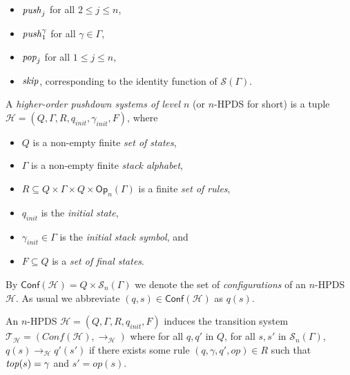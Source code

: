 \documentclass[a4paper,UKenglish,cleveref, autoref, thm-restate]{lipics-v2021}
\newcommand{\T}{\mathcal{T}}
\renewcommand{\H}{\mathcal{H}}
\newcommand{\Conf}{\mathsf{Conf}}
\newcommand{\Op}{\mathsf{Op}}
\begin{document}
\begin{itemize}
\item $\text{\textit{push}}_j$ for all $2 \leq j \leq n$,

\item $\text{\textit{push}}_1^\gamma$ for all $\gamma \in \Gamma$,

\item $\text{\textit{pop}}_j$ for all $1 \leq j \leq n$,

\item $\text{\textit{skip}}$, corresponding to the identity function of $\mathscr{S}(\Gamma)$.

\end{itemize}





\begin{samepage}
\par\noindent\ignorespacesafterend
A {\em higher-order pushdown systems of level $n$} (or $n$-HPDS for short) 
is a tuple $\H=(Q, \Gamma, R, q_{init}, \gamma_{init}, F)$,
where 
\begin{itemize}
        \item $Q$ is a non-empty finite {\em set of  states},
        \item $\Gamma$ is a non-empty finite {\em  stack alphabet},
	\item $R\subseteq Q\times \Gamma \times Q \times \Op_n(\Gamma)$ is a finite {\em set of  rules},
        \item $q_{init}$ is the {\em initial  state},
        \item $\gamma_{init} \in \Gamma$ is the {\em %
initial stack symbol}, and
	\item $F\subseteq Q$ is a {\em set of final  states}.
		\end{itemize}
\end{samepage}


\par\noindent\ignorespacesafterend
By $\Conf(\mathcal{H}) = Q \times \mathscr{S}_n(\Gamma)$
we denote the set of {\em configurations} of an $n$-HPDS $\H$. 
As usual we abbreviate $(q,s) \in \Conf(\mathcal{H})$ as $q(s)$.



An $n$-HPDS $\H=(Q, \Gamma, R, q_{init}, F)$
induces the transition system $\T_\H = (Conf(\mathcal{H}), \rightarrow_{\mathcal{H}})$
where
for all $q,q'$ in $Q$,
for all $s,s'$ in $\mathscr{S}_n(\Gamma)$,
$q(s) \rightarrow_{\mathcal{H}} q'(s')$ if
there exists some rule
$(q,\gamma,q',op) \in R$
such that
$\text{\textit{top}}(s) = \gamma$
and
$s' = op(s)$.
\end{document}
